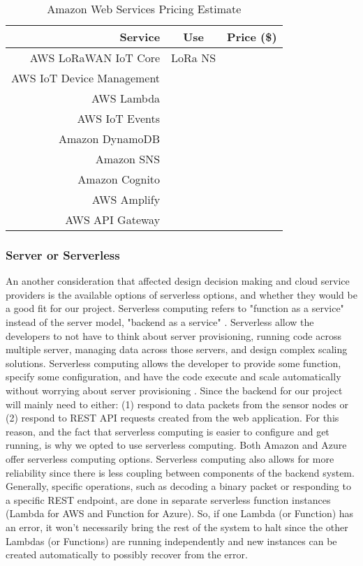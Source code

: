 \begin{table}[H]
\centering\scriptsize
\caption{Amazon Web Services Pricing Estimate}
\begin{tabular}{|r|c|c|}
\hline
Service & Use & Price (\$)\\
\hline\hline

AWS LoRaWAN IoT Core & LoRa NS & \\\hline
AWS IoT Device Management & & \\\hline
AWS Lambda & & \\\hline
AWS IoT Events & & \\\hline
Amazon DynamoDB & & \\\hline
Amazon SNS & & \\\hline
Amazon Cognito & & \\\hline
AWS Amplify & & \\\hline
AWS API Gateway & & \\\hline

\end{tabular}
\label{tbl:aws-pricing}
\end{table}

\subsubsection{Server or Serverless}
An another consideration that affected design decision making and cloud service providers is the
available options of serverless options, and whether they would be a good fit for our project.
Serverless computing refers to "function as a service" instead of the server model, "backend as
a service" \cite{server-vs-serverless}. Serverless allow the developers to not have to think about
server provisioning, running code across multiple server, managing data across those servers, and
design complex scaling solutions. Serverless computing allows the developer to provide some
function, specify some configuration, and have the code execute and scale automatically without
worrying about server provisioning \cite{aws-serverless}. Since the backend for our project will
mainly need to either: (1) respond to data packets from the sensor nodes or (2) respond to REST API
requests created from the web application. For this reason, and the fact that serverless computing
is easier to configure and get running, is why we opted to use serverless computing. Both Amazon and
Azure offer serverless computing options. Serverless computing also allows for more reliability
since there is less coupling between components of the backend system. Generally, specific
operations, such as decoding a binary packet or responding to a specific REST endpoint, are done in
separate serverless function instances (Lambda for AWS and Function for Azure). So, if one Lambda
(or Function) has an error, it won't necessarily bring the rest of the system to halt since the
other Lambdas (or Functions) are running independently and new instances can be created
automatically to possibly recover from the error.


